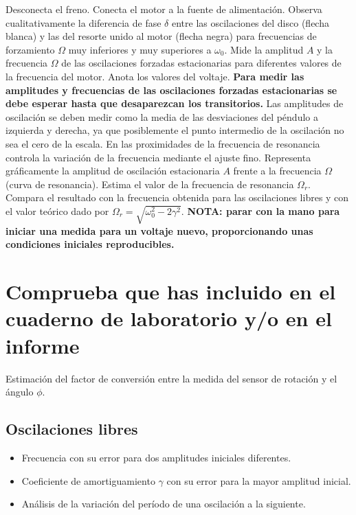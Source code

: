 \documentclass[11pt]{articulo}
\begin{document}
Desconecta el freno. Conecta el motor a la fuente de alimentaci\'on. Observa cualitativamente la diferencia de fase $\delta$ entre las oscilaciones del disco (flecha blanca) y las del resorte unido al motor (flecha negra) para frecuencias de forzamiento $\Omega$ muy inferiores y muy superiores a $\omega_0$. Mide la amplitud $A$ y la frecuencia $\Omega$ de las oscilaciones forzadas estacionarias para diferentes valores de la frecuencia del motor. Anota los valores del voltaje. {\bf Para medir las amplitudes y frecuencias de las oscilaciones forzadas estacionarias se debe esperar hasta que desaparezcan los transitorios.} Las amplitudes de oscilaci\'on se deben medir como la media de las desviaciones del p\'endulo a izquierda y derecha, ya que posiblemente el punto intermedio de la oscilaci\'on no sea el cero de la escala. En las proximidades de la frecuencia de resonancia controla la variaci\'on de la frecuencia mediante el ajuste fino. Representa gr\'aficamente la amplitud de oscilaci\'on estacionaria $A$ frente a la frecuencia $\Omega$ (curva de resonancia). Estima el valor de la frecuencia de resonancia $\Omega_r$. Compara el resultado con la frecuencia obtenida para las oscilaciones libres y con el valor te\'orico dado por $\Omega_r = \sqrt{\omega_0^2 - 2\gamma^2}$. {\bf NOTA: parar con la mano para iniciar una medida para un voltaje nuevo, proporcionando unas condiciones iniciales reproducibles.}


\section*{Comprueba que has incluido en el cuaderno de laboratorio y/o en el informe}

Estimaci\'on del factor de conversi\'on entre la medida del sensor de rotaci\'on y el \'angulo $\phi$.

\subsection*{Oscilaciones libres}

\begin{itemize}

\item{Frecuencia con su error para dos amplitudes iniciales diferentes.}
\item{Coeficiente de amortiguamiento $\gamma$ con su error para la mayor amplitud inicial.}
\item{An\'alisis de la variaci\'on del per\'iodo de una oscilaci\'on a la siguiente.}

\end{itemize}
\end{document}
